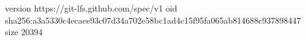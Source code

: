 version https://git-lfs.github.com/spec/v1
oid sha256:a3a5330c4ecaee93c07d34a702e58bc1ad4c15f95fa065ab814688c937898447
size 20394
